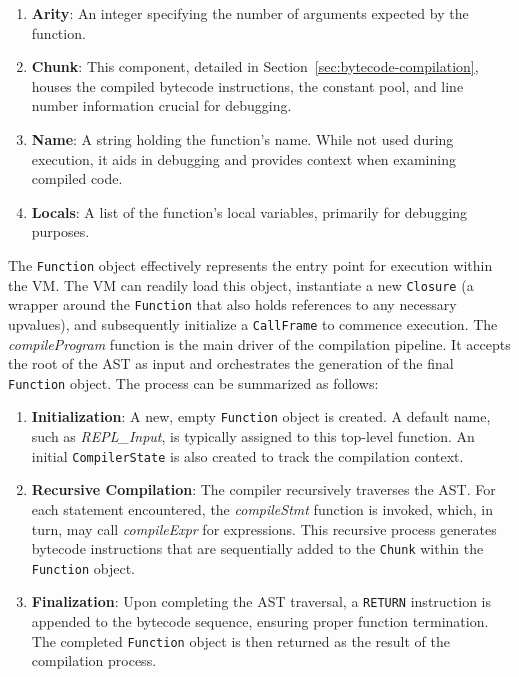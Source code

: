\begin{enumerate}
    \item \textbf{Arity}: An integer specifying the number of arguments expected by the function.
    \item \textbf{Chunk}: This component, detailed in Section~\ref{sec:bytecode-compilation}, houses the compiled bytecode instructions, the constant pool, and line number information crucial for debugging.
    \item \textbf{Name}: A string holding the function's name.
    While not used during execution, it aids in debugging and provides context when examining compiled code.
    \item \textbf{Locals}: A list of the function's local variables, primarily for debugging purposes.
\end{enumerate}
The \texttt{Function} object effectively represents the entry point for execution within the VM. The VM can readily load this object, instantiate a new \texttt{Closure} (a wrapper around the \texttt{Function} that also holds references to any necessary upvalues), and subsequently initialize a \texttt{CallFrame} to commence execution.
The \textit{compileProgram} function is the main driver of the compilation pipeline.
It accepts the root of the AST as input and orchestrates the generation of the final \texttt{Function} object.
The process can be summarized as follows:

\begin{enumerate}
    \item \textbf{Initialization}: A new, empty \texttt{Function} object is created.
    A default name, such as \textit{REPL\_Input}, is typically assigned to this top-level function.
    An initial \texttt{CompilerState} is also created to track the compilation context.
    \item \textbf{Recursive Compilation}: The compiler recursively traverses the AST. For each statement 
    encountered, the \textit{compileStmt} function is invoked, which, in turn, may call \textit{compileExpr} for expressions. 
    This recursive process generates bytecode instructions that are sequentially added to the \texttt{Chunk} within the \texttt{Function} object.
    \item \textbf{Finalization}: Upon completing the AST traversal, a \texttt{RETURN} instruction is appended to the bytecode sequence, ensuring proper function termination.
    The completed \texttt{Function} object is then returned as the result of the compilation process.
\end{enumerate}

